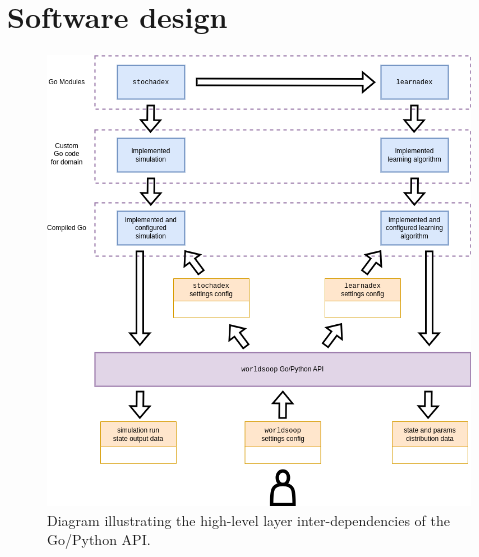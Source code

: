 \section{\sffamily Software design}

\begin{figure}[h]
\centering
\includegraphics[width=12cm]{images/chapter-5-high-level-dependencies.drawio.png}
\caption{Diagram illustrating the high-level layer inter-dependencies of the Go/Python API.}
\label{fig:high-level-api-dependencies}
\end{figure}
